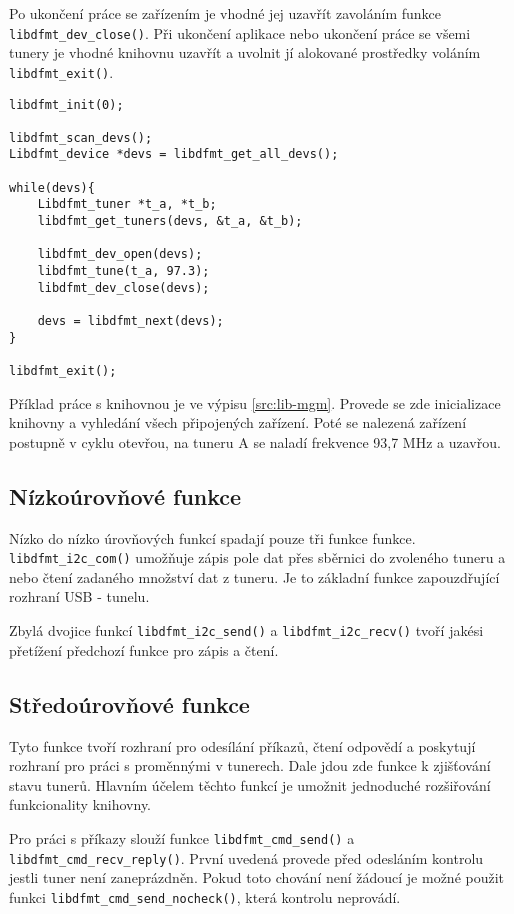 Po ukončení práce se zařízením je vhodné jej uzavřít zavoláním funkce \verb|libdfmt_dev_close()|. Při ukončení aplikace nebo ukončení práce se všemi tunery je vhodné knihovnu uzavřít a uvolnit jí alokované prostředky voláním \verb|libdfmt_exit()|.

\begin{lstlisting}[label=src:lib-mgm, caption=Ukázka práce s knihovnou.]
libdfmt_init(0);

libdfmt_scan_devs();
Libdfmt_device *devs = libdfmt_get_all_devs();

while(devs){
	Libdfmt_tuner *t_a, *t_b;
	libdfmt_get_tuners(devs, &t_a, &t_b);

	libdfmt_dev_open(devs);
	libdfmt_tune(t_a, 97.3);
	libdfmt_dev_close(devs);

	devs = libdfmt_next(devs);
}

libdfmt_exit();
\end{lstlisting}

Příklad práce s knihovnou je ve výpisu \ref{src:lib-mgm}. Provede se zde inicializace knihovny a vyhledání všech připojených zařízení. Poté se nalezená zařízení postupně v cyklu otevřou, na tuneru A se naladí frekvence 93,7 MHz a uzavřou.

\subsection{Nízkoúrovňové funkce}
Nízko do nízko úrovňových funkcí spadají pouze tři funkce funkce. \verb|libdfmt_i2c_com()| umožňuje zápis pole dat přes \iic sběrnici do zvoleného tuneru a nebo čtení zadaného množství dat z tuneru. Je to základní funkce zapouzdřující rozhraní USB - \iic tunelu.

Zbylá dvojice funkcí \verb|libdfmt_i2c_send()| a \verb|libdfmt_i2c_recv()|  tvoří jakési přetížení předchozí funkce pro zápis a čtení.

\subsection{Středoúrovňové funkce}

Tyto funkce tvoří rozhraní pro odesílání příkazů, čtení odpovědí a poskytují rozhraní pro práci s proměnnými v tunerech. Dale jdou zde funkce k zjišťování stavu tunerů. Hlavním účelem těchto funkcí je umožnit jednoduché rozšiřování funkcionality knihovny.

Pro práci s příkazy slouží funkce \verb|libdfmt_cmd_send()| a \verb|libdfmt_cmd_recv_reply()|. První uvedená provede před odesláním kontrolu jestli tuner není zaneprázdněn. Pokud toto chování není žádoucí je možné použit funkci \verb|libdfmt_cmd_send_nocheck()|, která kontrolu neprovádí.

